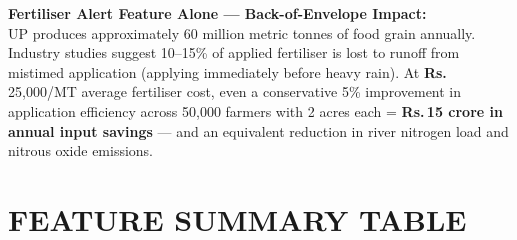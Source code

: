 \documentclass[12pt,a4paper]{article}
\newcommand{\Rup}{\textbf{Rs.\,}}
\begin{document}
\begin{impactbox}
\textbf{Fertiliser Alert Feature Alone --- Back-of-Envelope Impact:}\\[4pt]
UP produces approximately 60 million metric tonnes of food grain annually. Industry studies suggest 10--15\% of applied fertiliser is lost to runoff from mistimed application (applying immediately before heavy rain). At \Rup25,000/MT average fertiliser cost, even a conservative 5\% improvement in application efficiency across 50,000 farmers with 2 acres each = \textbf{\Rup15 crore in annual input savings} --- and an equivalent reduction in river nitrogen load and nitrous oxide emissions.
\end{impactbox}

\section{FEATURE SUMMARY TABLE}
\end{document}
